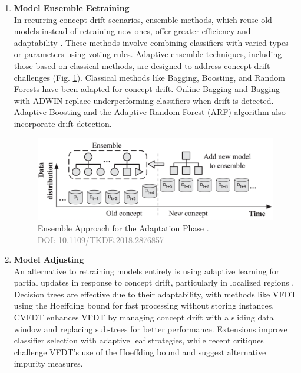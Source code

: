 \begin{enumerate}[label=\Alph*.]
\item \textbf{Model Ensemble Eetraining} \\
In recurring concept drift scenarios, ensemble methods, which reuse old models instead of retraining new ones, offer greater efficiency and adaptability \cite{sun2018concept}. These methods involve combining classifiers with varied types or parameters using voting rules. Adaptive ensemble techniques, including those based on classical methods, are designed to address concept drift challenges (Fig. \ref{fig:concept-drift-ensemble}). Classical methods like Bagging, Boosting, and Random Forests have been adapted for concept drift. Online Bagging \cite{oza2001experimental} and Bagging with ADWIN \cite{bifet2009new} replace underperforming classifiers when drift is detected. Adaptive Boosting \cite{chu2004fast} and the Adaptive Random Forest (ARF) algorithm \cite{gomes2017adaptive} also incorporate drift detection.

\vspace{-3mm}

 \begin{figure}[H]
    \centering
    \includegraphics[width=.9\textwidth]{2_Background/figures/ensemble_update.png}
    \caption{Ensemble Approach for the Adaptation Phase \cite{8496795}. \\ \textcolor{gray}{\fontsize{10}{0}\selectfont DOI: 10.1109/TKDE.2018.2876857}}
    \label{fig:concept-drift-ensemble}
\end{figure}
\vspace{-6mm}




\item \textbf{Model Adjusting} \\
An alternative to retraining models entirely is using adaptive learning for partial updates in response to concept drift, particularly in localized regions \cite{pratama2015evolving}. Decision trees are effective due to their adaptability, with methods like VFDT \cite{domingos2000mining} using the Hoeffding bound for fast processing without storing instances. CVFDT \cite{hulten2001mining} enhances VFDT by managing concept drift with a sliding data window and replacing sub-trees for better performance. Extensions \cite{yang2012incrementally, yang2015countering} improve classifier selection with adaptive leaf strategies, while recent critiques \cite{rutkowski2012decision, rutkowski2014new} challenge VFDT's use of the Hoeffding bound and suggest alternative impurity measures.
\vspace{-3mm}


\end{enumerate}
